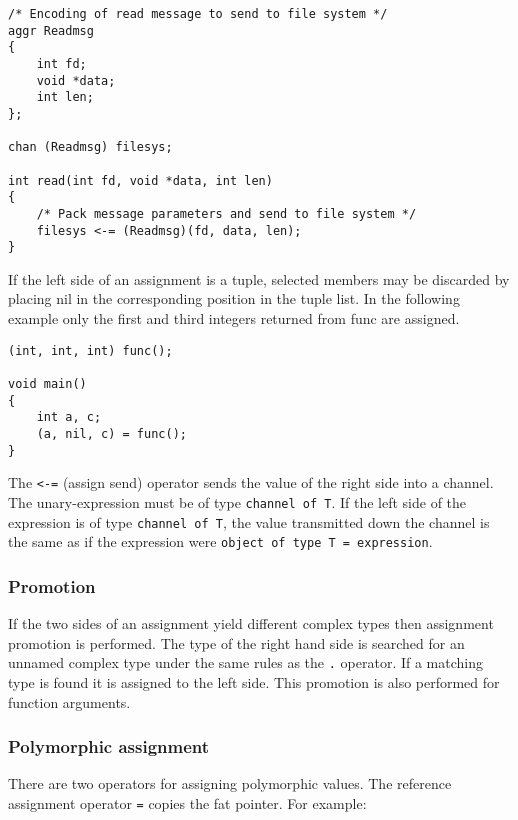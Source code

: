 \begin{lstlisting}
/* Encoding of read message to send to file system */
aggr Readmsg
{
    int fd;
    void *data;
    int len;
};

chan (Readmsg) filesys;

int read(int fd, void *data, int len)
{
    /* Pack message parameters and send to file system */
    filesys <-= (Readmsg)(fd, data, len);
}
\end{lstlisting}

If the left side of an assignment is a tuple, selected members may be
discarded by placing nil in the corresponding position in the tuple
list. In the following example only the first and third integers
returned from func are assigned.

\begin{lstlisting}
(int, int, int) func();

void main()
{
    int a, c;
    (a, nil, c) = func();
}
\end{lstlisting}

The \passthrough{\lstinline!<-=!} (assign send) operator sends the value
of the right side into a channel. The unary-expression must be of type
\passthrough{\lstinline!channel of T!}. If the left side of the
expression is of type \passthrough{\lstinline!channel of T!}, the value
transmitted down the channel is the same as if the expression were
\passthrough{\lstinline!object of type T = expression!}.

\hypertarget{promotion}{%
\subsubsection{Promotion}\label{promotion}}

If the two sides of an assignment yield different complex types then
assignment promotion is performed. The type of the right hand side is
searched for an unnamed complex type under the same rules as the
\passthrough{\lstinline!.!} operator. If a matching type is found it is
assigned to the left side. This promotion is also performed for function
arguments.

\hypertarget{polymorphic-assignment}{%
\subsubsection{Polymorphic assignment}\label{polymorphic-assignment}}

There are two operators for assigning polymorphic values. The reference
assignment operator \passthrough{\lstinline!=!} copies the fat pointer.
For example:

